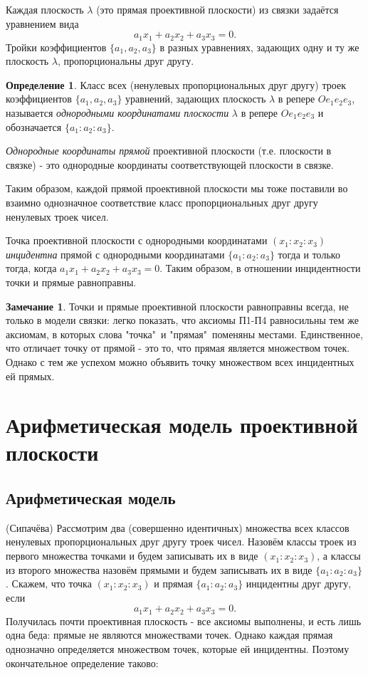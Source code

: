 \documentclass[a4paper, 12pt]{article}
\theoremstyle{definition}
\newtheorem*{definition}{Определение}
\newtheorem*{remark}{Замечание}
\begin{document}
Каждая плоскость $\lambda$ (это прямая проективной плоскости) из связки задаётся уравнением вида 
\[ a_1x_1 + a_2x_2 + a_3x_3 = 0. \]
Тройки коэффициентов $\{a_1,a_2,a_3\}$ в разных уравнениях, задающих одну и ту же плоскость $\lambda$, пропорциональны друг другу.

\begin{definition}
    Класс всех (ненулевых пропорциональных друг другу) троек коэффициентов $\{a_1,a_2,a_3\}$ уравнений, задающих плоскость $\lambda$ в репере $Oe_1e_2e_3$, называется \textit{однородными координатами плоскости} $\lambda$ в репере $Oe_1e_2e_3$ и обозначается $\{a_1:a_2:a_3\}$.

    \textit{Однородные координаты прямой} проективной плоскости (т.е. плоскости в связке) - это однородные координаты соответствующей плоскости в связке.
\end{definition}

Таким образом, каждой прямой проективной плоскости мы тоже поставили во взаимно однозначное соответствие класс пропорциональных друг другу ненулевых троек чисел.

Точка проективной плоскости с однородными координатами $(x_1:x_2:x_3)$ \textit{инцидентна} прямой с однородными координатами $\{a_1:a_2:a_3\}$ тогда и только тогда, когда $a_1x_1 + a_2x_2 + a_3x_3 = 0$. Таким образом, в отношении инцидентности точки и прямые равноправны.

\begin{remark}
    Точки и прямые проективной плоскости равноправны всегда, не только в модели связки: легко показать, что аксиомы П1-П4 равносильны тем же аксиомам, в которых слова "точка"\ и "прямая"\ поменяны местами. Единственное, что отличает точку от прямой - это то, что прямая является множеством точек. Однако с тем же успехом можно объявить точку множеством всех инцидентных ей прямых.
\end{remark}


\section{Арифметическая модель проективной плоскости}
\subsection{Арифметическая модель}
(Сипачёва) Рассмотрим два (совершенно идентичных) множества всех классов ненулевых пропорциональных друг другу троек чисел. Назовём классы троек из первого множества точками и будем записывать их в виде $(x_1:x_2:x_3)$, а классы из второго множества назовём прямыми и будем записывать их в виде $\{a_1:a_2:a_3\}$. 
Скажем, что точка $(x_1:x_2:x_3)$ и прямая $\{a_1:a_2:a_3\}$ инцидентны друг другу, если \[ a_1x_1 + a_2x_2 + a_3x_3 = 0. \]
Получилась почти проективная плоскость - все аксиомы выполнены, и есть лишь одна беда: прямые не являются множествами точек. Однако каждая прямая однозначно определяется множеством точек, которые ей инцидентны. Поэтому окончательное определение таково:
\end{document}
